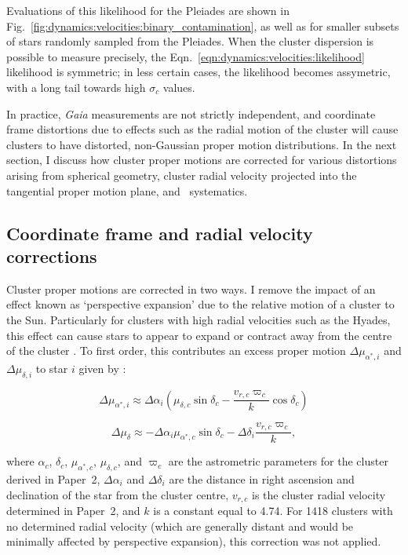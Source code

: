 Evaluations of this likelihood for the Pleiades are shown in Fig.~\ref{fig:dynamics:velocities:binary_contamination}, as well as for smaller subsets of stars randomly sampled from the Pleiades. When the cluster dispersion is possible to measure precisely, the Eqn.~\ref{eqn:dynamics:velocities:likelihood} likelihood is symmetric; in less certain cases, the likelihood becomes assymetric, with a long tail towards high $\sigma_c$ values.

In practice, \emph{Gaia} measurements are not strictly independent, and coordinate frame distortions due to effects such as the radial motion of the cluster will cause clusters to have distorted, non-Gaussian proper motion distributions. In the next section, I discuss how cluster proper motions are corrected for various distortions arising from spherical geometry, cluster radial velocity projected into the tangential proper motion plane, and \gaia\ systematics.


\subsection{Coordinate frame and radial velocity corrections}
\label{sec:dynamics:velocities:correction}

Cluster proper motions are corrected in two ways. I remove the impact of an effect known as `perspective expansion' due to the relative motion of a cluster to the Sun. Particularly for clusters with high radial velocities such as the Hyades, this effect can cause stars to appear to expand or contract away from the centre of the cluster \citep{kuhn_kinematics_2019}. To first order, this contributes an excess proper motion $\Delta \mu_{\alpha^*,i}$ and $\Delta \mu_{\delta,i}$ to star $i$ given by \citep{vanleeuwen_parallaxes_proper_2009}:

\begin{equation}
    \Delta \mu_{\alpha^*,i} \approx \Delta\alpha_i \left( 
        \mu_{\delta,c} \sin\delta_c - \frac{v_{r,c} \varpi_c}{k}\cos\delta_c
    \right)
\end{equation}

\begin{equation}
    \Delta \mu_{\delta} \approx -\Delta\alpha_i \mu_{\alpha^*,c} \sin\delta_c - \Delta\delta_i \frac{v_{r,c}\varpi_c}{k},
\end{equation}

\noindent
where $\alpha_c$, $\delta_c$, $\mu_{\alpha^*,c}$, $\mu_{\delta,c}$, and $\varpi_c$ are the astrometric parameters for the cluster derived in Paper~2, $\Delta\alpha_i$ and $\Delta\delta_i$ are the distance in right ascension and declination of the star from the cluster centre, $v_{r,c}$ is the cluster radial velocity determined in Paper~2, and $k$ is a constant equal to 4.74. For 1418 clusters with no determined radial velocity (which are generally distant and would be minimally affected by perspective expansion), this correction was not applied.

